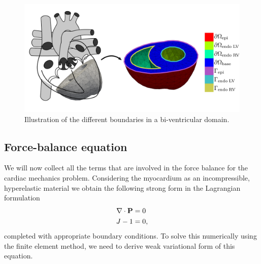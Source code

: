 \begin{figure}[htbp]
  \centering
    \includegraphics{chapters/introduction/figures/boundaries}
\caption{Illustration of the different boundaries in a bi-ventricular
  domain.}
\label{fig:boundaries}
\end{figure}


\subsection{Force-balance equation}
We will now collect all the terms that are involved in the force balance for
the cardiac mechanics problem. Considering the myocardium as an incompressible,
hyperelastic material we obtain the following strong form in the
Lagrangian formulation 
\begin{align}
  \begin{split}
  \nabla \cdot \mathbf{P} &= 0 \\
  J - 1 &= 0,
  \end{split}
 \label{eq:force_balance_strong}
\end{align}
completed with appropriate boundary conditions. To solve this
numerically using the finite element method, we need to derive weak
variational form of this equation.
 


